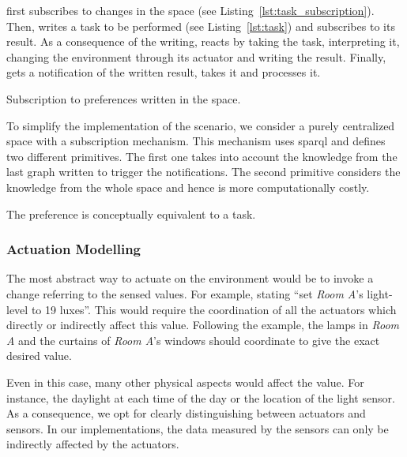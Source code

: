 \nodeProvSpace{} first subscribes to changes in the space (see Listing~\ref{lst:task_subscription}).
Then, \nodeConsSpace{} writes a task to be performed (see Listing~\ref{lst:task}) and subscribes to its result.
As a consequence of the writing, \nodeProvSpace{} reacts by taking the task, interpreting it, changing the environment through its actuator and writing the result.
Finally, \nodeConsSpace{} gets a notification of the written result, takes it and processes it.


\begin{listing}
  
  \caption{Subscription to preferences written in the space.}
  \label{lst:task_subscription}
\end{listing}


To simplify the implementation of the scenario, we consider a purely centralized space with a subscription mechanism.
This mechanism uses \acs{sparql}  and defines two different primitives.
The first one takes into account the knowledge from the last graph written to trigger the notifications.
The second primitive considers the knowledge from the whole space and hence is more computationally costly.


\begin{listing}
  
  \caption{The preference is conceptually equivalent to a task.}
  \label{lst:task}
\end{listing}



\subsubsection{Actuation Modelling}

The most abstract way to actuate on the environment would be to invoke a change referring to the sensed values.
For example, stating ``set \emph{Room A}'s light-level to 19 luxes''.
This would require the coordination of all the actuators which directly or indirectly affect this value.
Following the example, the lamps in \emph{Room A} and the curtains of \emph{Room A}'s windows should coordinate to give the exact desired value.


Even in this case, many other physical aspects would affect the value.
For instance, the daylight at each time of the day or the location of the light sensor.
As a consequence, we opt for clearly distinguishing between actuators and sensors.
In our implementations, the data measured by the sensors can only be indirectly affected by the actuators.


